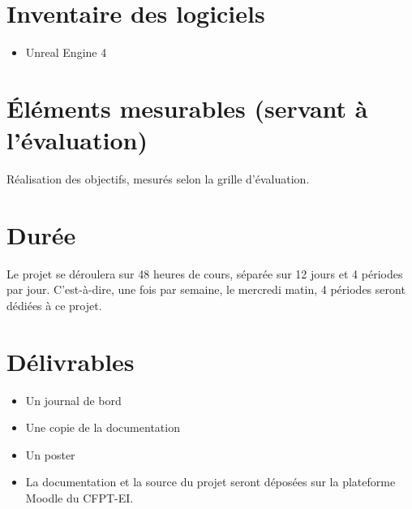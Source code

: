 \documentclass[11pt, a4paper]{article}
\begin{document}
\section{Inventaire des logiciels}
\begin{itemize}
\item Unreal Engine 4
\end{itemize}
\section{Éléments mesurables (servant à l'évaluation)}
Réalisation des objectifs, mesurés selon la grille d'évaluation.
\section{Durée}
Le projet se déroulera sur 48 heures de cours, séparée sur 12 jours et 4 périodes par jour. C'est-à-dire, une fois par semaine, le mercredi matin, 4 périodes seront dédiées à ce projet.
\section{Délivrables}
\begin{itemize}
\item Un journal de bord
\item Une copie de la documentation
\item Un poster
\item La documentation et la source du projet seront déposées sur la plateforme Moodle du CFPT-EI.
\end{itemize}
\end{document}
